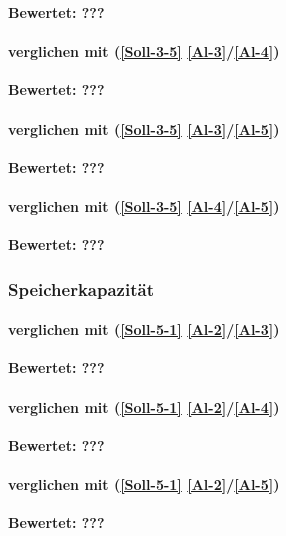 \textbf{Bewertet: ???}

\paragraph*{  verglichen mit  (\ref{Soll-3-5} \ref{Al-3}/\ref{Al-4})}

\textbf{Bewertet: ???}

\paragraph*{  verglichen mit  (\ref{Soll-3-5} \ref{Al-3}/\ref{Al-5})}

\textbf{Bewertet: ???}


\paragraph*{  verglichen mit  (\ref{Soll-3-5} \ref{Al-4}/\ref{Al-5})}

\textbf{Bewertet: ???}


\subsubsection{Speicherkapazität}

\paragraph*{  verglichen mit  (\ref{Soll-5-1} \ref{Al-2}/\ref{Al-3})}

\textbf{Bewertet: ???}

\paragraph*{  verglichen mit  (\ref{Soll-5-1} \ref{Al-2}/\ref{Al-4})}

\textbf{Bewertet: ???}

\paragraph*{  verglichen mit  (\ref{Soll-5-1} \ref{Al-2}/\ref{Al-5})}

\textbf{Bewertet: ???}

